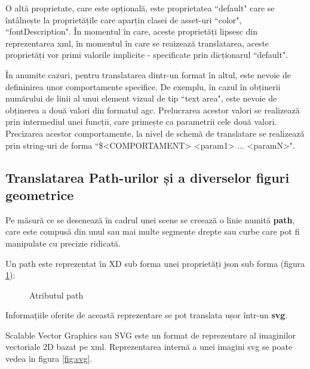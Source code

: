  O altă proprietate, care este opțională, este proprietatea ``default" care se întâlnește la proprietățile care aparțin clasei de asset-uri ``color", ``fontDescription". În momentul în care, aceste proprietăți lipsesc din reprezentarea xml, în momentul în care se reaizează translatarea, aceste proprietăți vor primi valorile implicite - specificate prin dicționarul ``default".

 În anumite cazuri, pentru translatarea dintr-un format în altul, este nevoie de defininirea unor comportamente specifice. De exemplu, în cazul în obținerii numărului de linii al unui element vizual de tip ``text area", este nevoie de obținerea a două valori din formatul agc. Prelucrarea acestor valori se realizează prin intermediul unei funcții, care primește ca parametrii cele două valori. 
 Precizarea acestor comportamente, la nivel de schemă de translatare se realizează prin string-uri de forma ``\$<COMPORTAMENT> <param1> ... <paramN>".

\subsection{Translatarea Path-urilor și a diverselor figuri geometrice}

Pe măsură ce se desenează în cadrul unei scene se creează o linie numită \textbf{path}, care este compusă din unul sau mai multe segmente drepte sau curbe care pot fi manipulate cu precizie ridicată.

Un path este reprezentat în XD sub forma unei proprietăți json sub forma (figura \ref{fig:path}):

\begin{figure}[!htbp]
\caption{Atributul path}\label{fig:path}
\end{figure}

Informațiile oferite de această reprezentare se pot translata ușor într-un \textbf{svg}. 

Scalable Vector Graphics sau SVG este un format de reprezentare al imaginilor vectoriale 2D bazat pe xml. Reprezentarea internă a unei imagini svg se poate vedea în figura \ref{fig:svg}.


